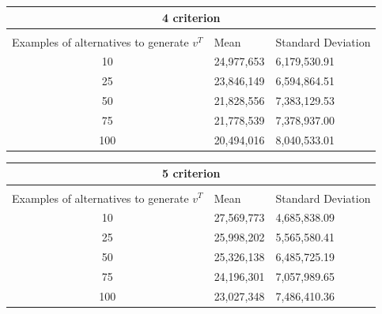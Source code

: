 \documentclass{report}
\begin{document}
\begin{center}
\begin{tabular}{ |c||p{3cm}|p{3cm}| }
 \hline
 \multicolumn{3}{|c|}{4 criterion} \\
 \hline
\\[-1em] Examples of alternatives to generate $v^T$& Mean & Standard Deviation\\
 \hline
 10   & 24,977,653    &6,179,530.91\\
 25   & 23,846,149    &6,594,864.51\\
 50   & 21,828,556    &7,383,129.53\\
 75   & 21,778,539    &7,378,937.00\\
 100 & 20,494,016    & 8,040,533.01\\
 \hline
\end{tabular}
\end{center}

\begin{center}
\begin{tabular}{ |c||p{3cm}|p{3cm}| }
 \hline
 \multicolumn{3}{|c|}{5 criterion} \\
 \hline
\\[-1em] Examples of alternatives to generate $v^T$& Mean & Standard Deviation\\
 \hline
 10   & 27,569,773    & 4,685,838.09\\
 25   & 25,998,202    & 5,565,580.41\\
 50   & 25,326,138    &6,485,725.19\\
 75   & 24,196,301    &7,057,989.65\\
 100 & 23,027,348    &7,486,410.36\\

 \hline
\end{tabular}
\end{center}
\end{document}
